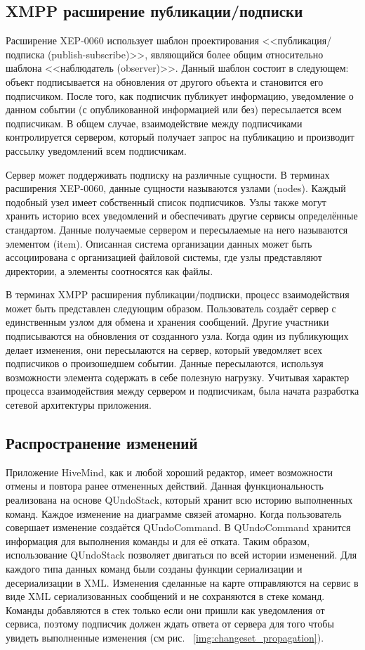 \subsection{XMPP расширение публикации/подписки}
Расширение XEP-0060 использует шаблон проектирования <<публикация/подписка
(publish-subscribe)>>, являющийся более общим относительно шаблона <<наблюдатель
(observer)>>. Данный шаблон состоит в следующем: объект подписывается на
обновления от другого объекта и становится его подписчиком. После того, как
подписчик публикует информацию, уведомление о данном событии (с опубликованной
информацией или без) пересылается всем подписчикам. В общем случае,
взаимодействие между подписчиками контролируется сервером, который получает
запрос на публикацию и производит рассылку уведомлений всем подписчикам.

Сервер может поддерживать подписку на различные сущности. В терминах расширения
XEP-0060, данные сущности называются узлами (nodes). Каждый подобный узел имеет
собственный список подписчиков. Узлы также могут хранить историю всех
уведомлений и обеспечивать другие сервисы определённые стандартом. Данные
получаемые сервером и пересылаемые на него называются элементом (item).
Описанная система организации данных может быть ассоциирована с организацией
файловой системы, где узлы представляют директории, а элементы соотносятся как
файлы.

В терминах XMPP расширения публикации/подписки, процесс взаимодействия может
быть представлен следующим образом. Пользователь создаёт сервер с единственным
узлом для обмена и хранения сообщений. Другие участники подписываются на
обновления от созданного узла. Когда один из публикующих делает изменения, они
пересылаются на сервер, который уведомляет всех подписчиков о произошедшем
событии. Данные пересылаются, используя возможности элемента содержать в себе
полезную нагрузку. Учитывая характер процесса взаимодействия между сервером и
подписчикам, была начата разработка сетевой архитектуры приложения.

\subsection{Распространение изменений}
\label{sec:changeset_propagation}
Приложение HiveMind, как и любой хороший редактор, имеет возможности отмены и
повтора ранее отмененных действий. Данная функциональность реализована на основе
QUndoStack, который хранит всю историю выполненных команд. Каждое изменение на
диаграмме связей атомарно. Когда пользователь совершает изменение создаётся
QUndoCommand. В QUndoCommand хранится информация для выполнения команды и для её
отката. Таким образом, использование QUndoStack позволяет двигаться по всей
истории изменений. Для каждого типа данных команд были созданы функции
сериализации и десериализации в XML. Изменения сделанные на карте отправляются
на сервис в виде XML сериализованных сообщений и не сохраняются в стеке команд.
Команды добавляются в стек только если они пришли как уведомления от сервиса,
поэтому подписчик должен ждать ответа от сервера для того чтобы увидеть
выполненные изменения (см рис. ~\ref{img:changeset_propagation}).

